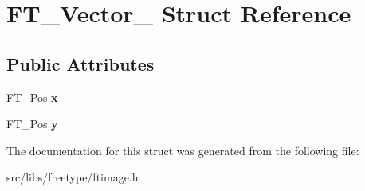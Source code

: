 \hypertarget{struct_f_t___vector__}{
\section{FT\_\-Vector\_\- Struct Reference}
\label{struct_f_t___vector__}
}
\subsection*{Public Attributes}
\begin{DoxyCompactItemize}
\item 
\hypertarget{struct_f_t___vector___a941e818e6dfca06409cddff4f325f74c}{
FT\_\-Pos {\bfseries x}}
\label{struct_f_t___vector___a941e818e6dfca06409cddff4f325f74c}

\item 
\hypertarget{struct_f_t___vector___ac3246ed214e880047ec74eeb15f8b973}{
FT\_\-Pos {\bfseries y}}
\label{struct_f_t___vector___ac3246ed214e880047ec74eeb15f8b973}

\end{DoxyCompactItemize}


The documentation for this struct was generated from the following file:\begin{DoxyCompactItemize}
\item 
src/libs/freetype/ftimage.h\end{DoxyCompactItemize}
